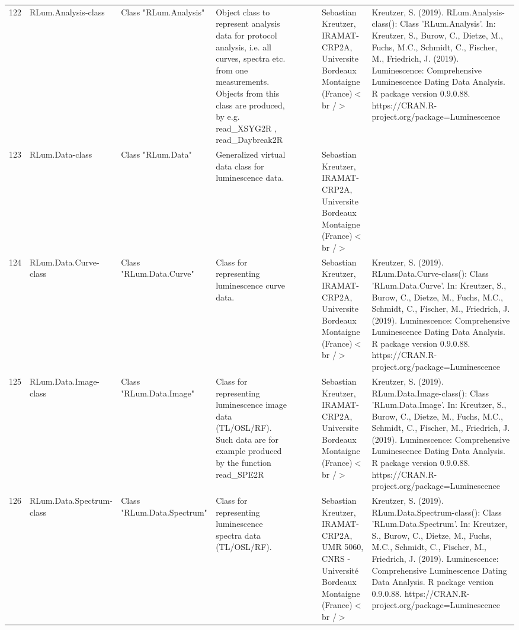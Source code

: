 \begin{table}[ht]
\begin{tabular}{rllllllll}
 \\ 
  122 & RLum.Analysis-class & Class  "RLum.Analysis" & Object class to represent analysis data for protocol analysis, i.e. all curves, spectra etc. from one measurements. Objects from this class are produced, by e.g.  read\_XSYG2R ,  read\_Daybreak2R &  &  &  & Sebastian Kreutzer, IRAMAT-CRP2A, Universite Bordeaux Montaigne (France)$<$br /$>$ & Kreutzer, S. (2019). RLum.Analysis-class(): Class 'RLum.Analysis'. In: Kreutzer, S., Burow, C., Dietze, M., Fuchs, M.C., Schmidt, C., Fischer, M., Friedrich, J. (2019). Luminescence: Comprehensive Luminescence Dating Data Analysis. R package version 0.9.0.88. https://CRAN.R-project.org/package=Luminescence
 \\ 
  123 & RLum.Data-class & Class  "RLum.Data" & Generalized virtual data class for luminescence data. &  &  &  & Sebastian Kreutzer, IRAMAT-CRP2A, Universite Bordeaux Montaigne (France)$<$br /$>$ &  \\ 
  124 & RLum.Data.Curve-class & Class  "RLum.Data.Curve" & Class for representing luminescence curve data. &  &  &  & Sebastian Kreutzer, IRAMAT-CRP2A, Universite Bordeaux Montaigne (France)$<$br /$>$ & Kreutzer, S. (2019). RLum.Data.Curve-class(): Class 'RLum.Data.Curve'. In: Kreutzer, S., Burow, C., Dietze, M., Fuchs, M.C., Schmidt, C., Fischer, M., Friedrich, J. (2019). Luminescence: Comprehensive Luminescence Dating Data Analysis. R package version 0.9.0.88. https://CRAN.R-project.org/package=Luminescence
 \\ 
  125 & RLum.Data.Image-class & Class  "RLum.Data.Image" & Class for representing luminescence image data (TL/OSL/RF). Such data are for example produced by the function  read\_SPE2R &  &  &  & Sebastian Kreutzer, IRAMAT-CRP2A, Universite Bordeaux Montaigne (France)$<$br /$>$ & Kreutzer, S. (2019). RLum.Data.Image-class(): Class 'RLum.Data.Image'. In: Kreutzer, S., Burow, C., Dietze, M., Fuchs, M.C., Schmidt, C., Fischer, M., Friedrich, J. (2019). Luminescence: Comprehensive Luminescence Dating Data Analysis. R package version 0.9.0.88. https://CRAN.R-project.org/package=Luminescence
 \\ 
  126 & RLum.Data.Spectrum-class & Class  "RLum.Data.Spectrum" & Class for representing luminescence spectra data (TL/OSL/RF). &  &  &  & Sebastian Kreutzer, IRAMAT-CRP2A, UMR 5060, CNRS - Université Bordeaux Montaigne (France)$<$br /$>$ & Kreutzer, S. (2019). RLum.Data.Spectrum-class(): Class 'RLum.Data.Spectrum'. In: Kreutzer, S., Burow, C., Dietze, M., Fuchs, M.C., Schmidt, C., Fischer, M., Friedrich, J. (2019). Luminescence: Comprehensive Luminescence Dating Data Analysis. R package version 0.9.0.88. https://CRAN.R-project.org/package=Luminescence

\end{tabular}
\end{table}
